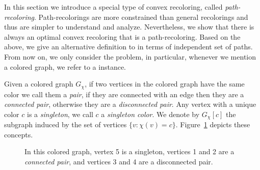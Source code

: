 \label{sec:path_recoloring}

In this section we introduce a special type of convex recoloring,
called \emph{path-recoloring}. 
%
Path-recolorings are more constrained than general recolorings and thus are simpler to
understand and analyze.
%
Nevertheless, 
we show that there is always an optimal convex recoloring that is a path-recoloring.
%
Based on the above, 
we give an alternative definition to \TWOCR{} in terms of independent set of paths.
%
From now on, we only consider the \TWOCR{} problem,
in particular, 
whenever we mention a colored graph, 
we refer to a \TWOCR{} instance.

Given a colored graph $G_\chi$, 
if two vertices in the colored graph have the same color we call them a \emph{pair}, 
if they are connected with an edge then they are a \emph{connected pair}, 
otherwise they are a \emph{disconnected pair}.  
%
Any vertex with a unique color $c$ is a \emph{singleton}, 
we call $c$ a \emph{singleton color}.
%
We denote by $G_\chi[c]$ the subgraph induced by the set of vertices $\{v : \chi(v) = c\}$.
%
Figure~\ref{fig:concepts} depicts these concepts.


\begin{figure}[t]
\centering
{}
\caption{
	\label{fig:concepts}
	In this colored graph, vertex 5 is a singleton, vertices 1 and 2
	are a \emph{connected pair}, and vertices 3 and 4 are a disconnected pair.
}
\end{figure}

